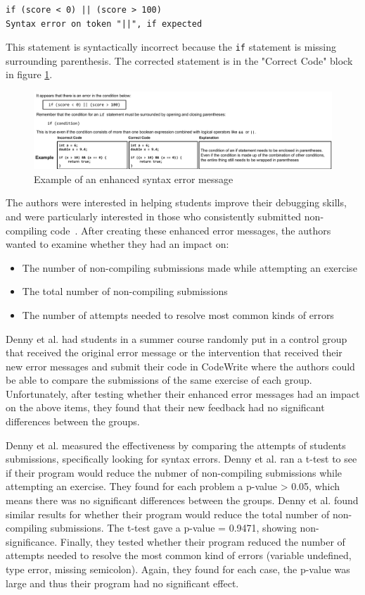 \documentclass{sig-alternate}
\begin{document}
\begin{verbatim}
if (score < 0) || (score > 100)
Syntax error on token "||", if expected
\end{verbatim}

This statement is syntactically incorrect because the \texttt{if} statement is missing surrounding parenthesis. The corrected statement is in the "Correct Code" block in figure \ref{fig:ese}.

\begin{figure}
  \centering
  \includegraphics[keepaspectratio, width=\textwidth]{EnhancedSyntaxError.pdf}
  \caption{Example of an enhanced syntax error message}
  \label{fig:ese}
\end{figure}

The authors were interested in helping students improve their debugging skills, and were particularly interested in those who consistently submitted non-compiling code~\cite{Denny:2014:ESE:2591708.2591748}.
After creating these enhanced error messages, the authors wanted to examine whether they had an impact on:
\begin{itemize}
	\item The number of non-compiling submissions made while attempting an exercise
	\item The total number of non-compiling submissions
	\item The number of attempts needed to resolve most common kinds of errors
\end{itemize}

Denny et al. had students in a summer course randomly put in a control group that received the original error message or the intervention that received their new error messages and submit their code in CodeWrite where the authors could be able to compare the submissions of the same exercise of each group.
Unfortunately, after testing whether their enhanced error messages had an impact on the above items, they found that their new feedback had no significant differences between the groups.

Denny et al. measured the effectiveness by comparing the attempts of students submissions, specifically looking for syntax errors.
Denny et al. ran a t-test to see if their program would reduce the nubmer of non-compiling submissions while attempting an exercise.
They found for each problem a p-value > 0.05, which means there was no significant differences between the groups.
Denny et al. found similar results for whether their program would reduce the total number of non-compiling submissions.
The t-test gave a p-value = 0.9471, showing non-significance.
Finally, they tested whether their program reduced the number of attempts needed to resolve the most common kind of errors (variable undefined, type error, missing semicolon).
Again, they found for each case, the p-value was large and thus their program had no significant effect.
\end{document}
